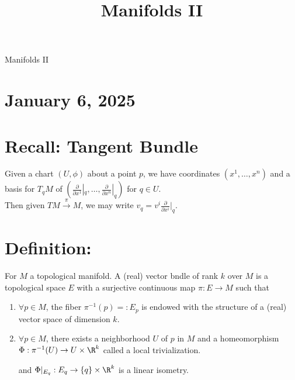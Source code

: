 \documentclass[11pt]{article}
\date{}
\title{Manifolds II}
\begin{document}
{\centering
{\LARGE Manifolds II \par }}
\section*{January 6, 2025}
\label{sec:org545e18f}
\section*{Recall: Tangent Bundle}
\label{sec:org9356509}
Given a chart \((U,\phi)\) about a point \(p\), we have coordinates \((x^{1},\ldots,x^{n})\) and a basis for \(T_{q}M\) of \(\left( \frac{\partial}{\partial x^{1}}|_{q},\ldots,\frac{\partial}{\partial x^{n}}|_{q} \right)\) for \(q\in U\).\\
Then given \(TM\overset{\pi}{\to}M\), we may write \(v_{q}=v^{i}\frac{\partial}{\partial x^{i}}|_{q}\).\\
\section*{Definition:}
\label{sec:org8ca3624}
For \(M\) a topological manifold. A (real) vector bndle of rank \(k\) over \(M\) is a topological space \(E\) with a surjective continuous map \(\pi:E\to M\) such that\\
\begin{enumerate}
\item \(\forall p\in M\), the fiber \(\pi^{-1}(p)=:E_{p}\) is endowed with the structure of a (real) vector space of dimension \(k\).\\
\item \(\forall p\in M\), there exists a neighborhood \(U\) of \(p\) in \(M\) and a homeomorphism \(\Phi:\pi^{-1}(U)\to U\times\R^{k}\) called a local trivialization.\\


and \(\Phi|_{E_{q}}:E_{q}\to\{q\}\times\R^{k}\) is a linear isometry.\\
\end{enumerate}
\end{document}
